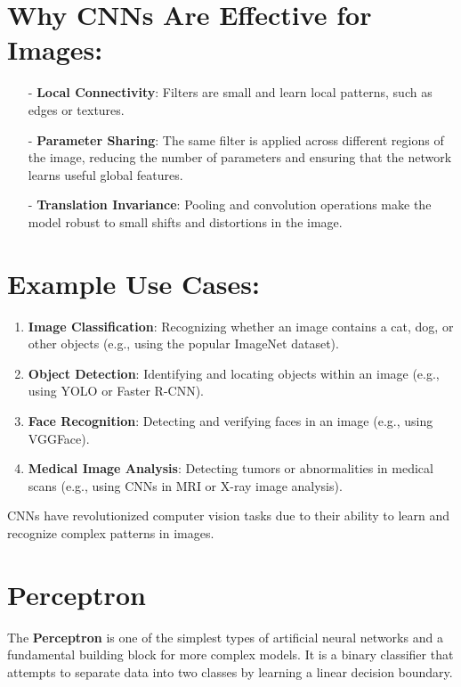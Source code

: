 \documentclass[10pt]{article}
\begin{document}
\section{ Why CNNs Are Effective for Images:}

\begin{itemize}
   \item [-] {\bf Local Connectivity}: Filters are small and learn local patterns, such as edges or textures.
   \item [-] {\bf Parameter Sharing}: The same filter is applied across different regions of the image, reducing the number of parameters and ensuring that the network learns useful global features.
   \item [-] {\bf Translation Invariance}: Pooling and convolution operations make the model robust to small shifts and distortions in the image.
\end{itemize}

\section{Example Use Cases:}
\begin{enumerate}
   \item {\bf Image Classification}: Recognizing whether an image contains a cat, dog, or other objects (e.g., using the popular ImageNet dataset).
   \item {\bf Object Detection}: Identifying and locating objects within an image (e.g., using YOLO or Faster R-CNN).
   \item {\bf Face Recognition}: Detecting and verifying faces in an image (e.g., using VGGFace).
   \item {\bf Medical Image Analysis}: Detecting tumors or abnormalities in medical scans (e.g., using CNNs in MRI or X-ray image analysis).
\end{enumerate}

CNNs have revolutionized computer vision tasks due to their ability to learn and recognize complex patterns in images.

\section {Perceptron}

The {\bf Perceptron} is one of the simplest types of artificial neural networks and a fundamental building block for more complex models. It is a binary classifier that attempts to separate data into two classes by learning a linear decision boundary.
\end{document}
